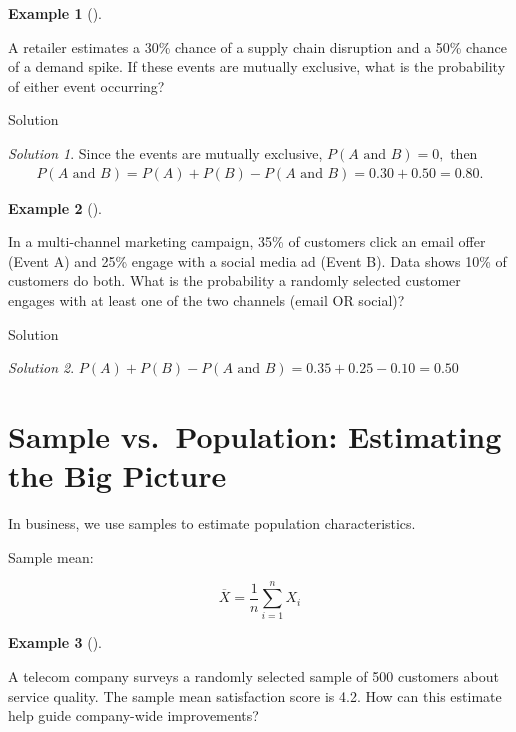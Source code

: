 \documentclass[
  12pt,
]{scrbook}
\theoremstyle{definition}
\newtheorem{example}{Example}[section]
\theoremstyle{remark}
\newtheorem{refsolution}{Solution}[section]
\begin{document}
\begin{example}[]\protect\hypertarget{exm-1}{}\label{exm-1}

A retailer estimates a 30\% chance of a supply chain disruption and a
50\% chance of a demand spike. If these events are mutually exclusive,
what is the probability of either event occurring?

\end{example}

Solution

\begin{refsolution}
Since the events are mutually exclusive, \(P(A \text{ and } B)=0,\) then
\[
\begin{split}
P(A \text{ and } B)=P(A)+P(B)-P(A \text{ and } B)=0.30+0.50=0.80.
\end{split}
\]

\label{sol-1}

\end{refsolution}

\begin{example}[]\protect\hypertarget{exm-2}{}\label{exm-2}

In a multi-channel marketing campaign, 35\% of customers click an email
offer (Event A) and 25\% engage with a social media ad (Event B). Data
shows 10\% of customers do both. What is the probability a randomly
selected customer engages with at least one of the two channels (email
OR social)?

\end{example}

Solution

\begin{refsolution}
\leavevmode

\(P(A) + P(B) - P(A \text{ and } B) = 0.35 + 0.25 - 0.10 = 0.50\)

\label{sol-2}

\end{refsolution}

\section{Sample vs.~Population: Estimating the Big
Picture}\label{sample-vs.-population-estimating-the-big-picture}

In business, we use samples to estimate population characteristics.

Sample mean:

\[
\overline{X} = \frac{1}{n} \sum_{i=1}^n X_i
\]

\begin{example}[]\protect\hypertarget{exm-telecom}{}\label{exm-telecom}

A telecom company surveys a randomly selected sample of 500 customers
about service quality. The sample mean satisfaction score is 4.2. How
can this estimate help guide company-wide improvements?

\end{example}
\end{document}
